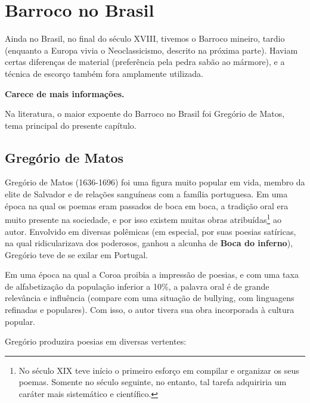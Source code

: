 
\chapter{Barroco no Brasil}

Ainda no Brasil, no final do século XVIII, tivemos o Barroco mineiro, tardio (enquanto a Europa vivia o Neoclassicismo, descrito na próxima parte). Haviam certas diferenças de material (preferência pela pedra sabão ao mármore), e a técnica de escorço também fora amplamente utilizada.


\textbf{Carece de mais informações.}

Na literatura, o maior expoente do Barroco no Brasil foi Gregório de Matos, tema principal do presente capítulo.

\section{Gregório de Matos}

Gregório de Matos (1636-1696) foi uma figura muito popular em vida, membro da elite de Salvador e de relações sanguíneas com a família portuguesa. Em uma época na qual os poemas eram passados de boca em boca, a tradição oral era muito presente na sociedade, e por isso existem muitas obras atribuídas\footnote{No século XIX teve início o primeiro esforço em compilar e organizar os seus poemas. Somente no século seguinte, no entanto, tal tarefa adquiriria um caráter mais sistemático e científico.} ao autor. Envolvido em diversas polêmicas (em especial, por suas poesias satíricas, na qual ridicularizava dos poderosos, ganhou a alcunha de \textbf{Boca do inferno}), Gregório teve de se exilar em Portugal.

Em uma época na qual a Coroa proibia a impressão de poesias, e com uma taxa de alfabetização da população inferior a 10\%, a palavra oral é de grande relevância e influência (compare com uma situação de bullying, com linguagens refinadas e populares). Com isso, o autor tivera sua obra incorporada à cultura popular.

Gregório produzira poesias em diversas vertentes:


